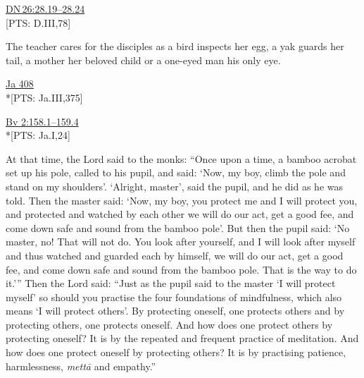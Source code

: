 \documentclass[10pt, openright]{book}
\begin{document}
\begin{flushright}
\href{https://suttacentral.net/dn26/en/sujato\#28.19}{DN 26:28.19–28.24}\\

[PTS: D.III,78]


\end{flushright}
The teacher cares for the disciples as a bird inspects her egg, a yak guards her tail, a mother her beloved child or a one-eyed man his only eye.


\begin{flushright}
\href{https://suttacentral.net/ja408/en/francis-neil}{Ja 408}\\

*[PTS: Ja.III,375]


\end{flushright}


\begin{flushright}
\href{https://suttacentral.net/bv2/pli/ms#158.1}{Bv 2:158.1–159.4}\\

*[PTS: Ja.I,24]


\end{flushright}
At that time, the Lord said to the monks: “Once upon a time, a bamboo acrobat set up his pole, called to his pupil, and said: ‘Now, my boy, climb the pole and stand on my shoulders’. ‘Alright, master’, said the pupil, and he did as he was told. Then the master said: ‘Now, my boy, you protect me and I will protect you, and protected and watched by each other we will do our act, get a good fee, and come down safe and sound from the bamboo pole’. But then the pupil said: ‘No master, no! That will not do. You look after yourself, and I will look after myself and thus watched and guarded each by himself, we will do our act, get a good fee, and come down safe and sound from the bamboo pole. That is the way to do it.’” Then the Lord said: “Just as the pupil said to the master ‘I will protect myself’ so should you practise the four foundations of mindfulness, which also means ‘I will protect others’. By protecting oneself, one protects others and by protecting others, one protects oneself. And how does one protect others by protecting oneself? It is by the repeated and frequent practice of meditation. And how does one protect oneself by protecting others? It is by practising patience, harmlessness, \textit{mettā} and empathy.”
\end{document}
